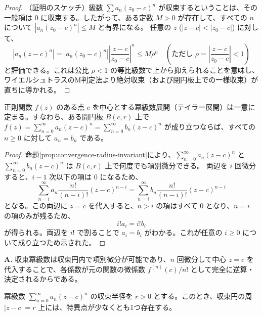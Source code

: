 \begin{proof}%
    （証明のスケッチ）級数 $\sum a_n (z_0-c)^n$ が収束するということは、その一般項は $0$ に収束する。したがって、ある定数 $M > 0$ が存在して、すべての $n$ について $|a_n (z_0-c)^n| \le M$ と有界になる。
    任意の $z$ ($|z-c| < |z_0-c|$) に対して、
    \[
    |a_n (z-c)^n| = |a_n (z_0-c)^n| \left| \frac{z-c}{z_0-c} \right|^n \le M \rho^n \quad \left( \text{ただし } \rho = \left| \frac{z-c}{z_0-c} \right| < 1 \right)
    \]
    と評価できる。これは公比 $\rho < 1$ の等比級数で上から抑えられることを意味し、ワイエルシュトラスのM判定法より絶対収束（および閉円板上での一様収束）が直ちに導かれる。
\end{proof}
\begin{proposition}[冪級数展開の一意性]\label{prop:uniqueness_of_power_series}
    正則関数 $f(z)$ のある点 $c$ を中心とする冪級数展開（テイラー展開）は一意に定まる。すなわち、ある開円板 $B(c, r)$ 上で $f(z) = \sum_{n=0}^{\infty} a_n (z-c)^n = \sum_{n=0}^{\infty} b_n (z-c)^n$ が成り立つならば、すべての $n \ge 0$ に対して $a_n = b_n$ である。
\end{proposition}

\begin{proof}
    命題\ref{prop:convergence-radius-invariant}により、$\sum_{n=0}^{\infty} a_n (z-c)^n$ と $\sum_{n=0}^{\infty} b_n (z-c)^n$ は $B(c, r)$ 上で何度でも項別微分できる。
    両辺を $i$ 回微分すると、$i-1$ 次以下の項は $0$ になるため、
    $$
    \sum_{n=i}^{\infty} a_n\frac{n!}{(n-i)!} (z-c)^{n-i} = \sum_{n=i}^{\infty} b_n\frac{n!}{(n-i)!} (z-c)^{n-i}
    $$
    となる。この両辺に $z=c$ を代入すると、$n > i$ の項はすべて $0$ となり、$n=i$ の項のみが残るため、
    $$
    i! a_i = i! b_i
    $$
    が得られる。両辺を $i!$ で割ることで $a_i = b_i$ がわかる。これが任意の $i \ge 0$ について成り立つため示された。
\end{proof}

\begin{Q}
\textbf{A.} 収束冪級数は収束円内で項別微分が可能であり、$n$ 回微分して中心 $z=c$ を代入することで、各係数が元の関数の微係数 $f^{(n)}(c)/n!$ として完全に逆算・決定されるからである。
\end{Q}
\begin{proposition}\label{prop:singular_point_on_convergence_circle}
    冪級数 $\sum_{n=0}^{\infty}a_{n}(z-c)^{n}$ の収束半径を $r>0$ とする。このとき、収束円の周 $|z-c|=r$ 上には、特異点が少なくとも1つ存在する。
\end{proposition}

